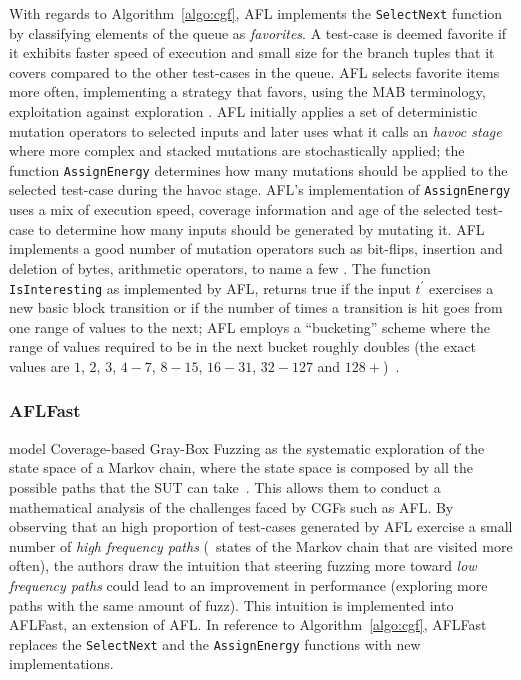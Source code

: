 With regards to Algorithm~\ref{algo:cgf}, AFL implements the \texttt{SelectNext}
function by classifying elements of the queue as \emph{favorites}. A test-case
is deemed favorite if it exhibits faster speed of execution and small size for
the branch tuples that it covers compared to the other test-cases in the queue.
AFL selects favorite items more often, implementing a strategy that favors,
using the \ac{MAB} terminology, exploitation against exploration
\cite{bohme2017coverage}. AFL initially applies a set of deterministic mutation
operators to selected inputs and later uses what it calls an \emph{havoc stage}
where more complex and stacked mutations are stochastically applied; the
function \texttt{AssignEnergy} determines how many mutations should be applied
to the selected test-case during the havoc stage. AFL's implementation of
\texttt{AssignEnergy} uses a mix of execution speed, coverage information and
age of the selected test-case to determine how many inputs should be generated
by mutating it. AFL implements a good number of mutation operators such as
bit-flips, insertion and deletion of bytes, arithmetic operators, to name a few
\cite{aflmut}. The function \texttt{IsInteresting} as implemented by AFL,
returns true if the input $t^\prime$ exercises a new basic block transition or
if the number of times a transition is hit goes from one range of values to the
next; AFL employs a ``bucketing'' scheme where the range of values required to
be in the next bucket roughly doubles (the exact values are $1$, $2$, $3$,
$4-7$, $8-15$, $16-31$, $32-127$ and $128+$)~\cite{afltech}.

\subsubsection{AFLFast}
\citeauthor{bohme2017coverage} model Coverage-based Gray-Box Fuzzing as the
systematic exploration of the state space of a Markov chain, where the state
space is composed by all the possible paths that the \ac{SUT} can
take~\cite{bohme2017coverage}. This allows them to conduct a mathematical
analysis of the challenges faced by \acp{CGF} such as AFL\@. By observing that
an high proportion of test-cases generated by AFL exercise a small number of
\emph{high frequency paths} (\ie~states of the Markov chain that are visited
more often), the authors draw the intuition that steering fuzzing more toward
\emph{low frequency paths} could lead to an improvement in performance
(exploring more paths with the same amount of fuzz). This intuition is
implemented into AFLFast, an extension of AFL\@. In reference to
Algorithm~\ref{algo:cgf}, AFLFast replaces the \texttt{SelectNext} and the
\texttt{AssignEnergy} functions with new implementations.

